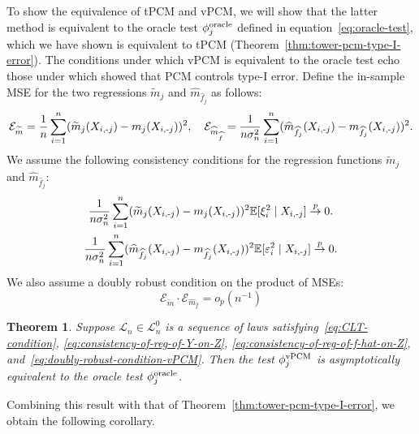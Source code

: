 \documentclass[12pt]{article}
\newtheorem{theorem}{Theorem}
\theoremstyle{definition}
\theoremstyle{remark}
\newcommand{\E}{\mathbb E}								%
\newcommand{\srx}{X}									%
\newcommand{\law}{\mathcal L}							%
\newcommand{\nulllaws}{\mathscr L^0}					%
\newcommand{\minus}{\textnormal{-}} 						    %
\begin{document}
To show the equivalence of tPCM and vPCM, we will show that the latter method is equivalent to the oracle test $\phi_j^{\textnormal{oracle}}$ defined in equation~\eqref{eq:oracle-test}, which we have shown is equivalent to tPCM (Theorem~\ref{thm:tower-pcm-type-I-error}). The conditions under which vPCM is equivalent to the oracle test echo those under which \citet{Lundborg2022a} showed that PCM controls type-I error. Define the in-sample MSE for the two regressions $\widetilde m_j$ and $\widehat{m}_{\widehat f_j}$ as follows:
\begin{gather*}
	\mathcal{E}_{\widetilde m} = \frac{1}{n} \sum_{i=1}^n (\widetilde m_j(\srx_{i,\minus j}) - m_j(\srx_{i,\minus j}))^2,\quad
	\mathcal{E}_{\widehat m_{\widehat f}} = \frac{1}{n\sigma_n^2} \sum_{i=1}^n (\widehat m_{\widehat f_j}(\srx_{i,\minus j}) - m_{\widehat f_j}(\srx_{i,\minus j}))^2.
\end{gather*}
We assume the following consistency conditions for the regression functions $\widetilde m_j$ and $\widehat m_{\widehat f_j}$:
\begin{gather}\label{eq:consistency-of-reg-of-Y-on-Z}
	\frac{1}{n\sigma_n^2}\sum_{i=1}^n (\widetilde m_j(\srx_{i,\minus j}) - m_j(\srx_{i,\minus j}))^2 \E[\xi_i^2\mid \srx_{i,\minus j}] \overset{p}{\to} 0.\\
	\label{eq:consistency-of-reg-of-f-hat-on-Z}
	\frac{1}{n\sigma_n^2} \sum_{i=1}^n (\widehat m_{\widehat f_j}(\srx_{i,\minus j}) - m_{\widehat f_j}(\srx_{i,\minus j}))^2\E[\varepsilon^2_i \mid \srx_{i,\minus j}] \overset{p}{\to} 0.
\end{gather} 	
We also assume a doubly robust condition on the product of MSEs:
\begin{equation}\label{eq:doubly-robust-condition-vPCM}
	\mathcal{E}_{\widetilde m} \cdot \mathcal{E}_{\widehat m_{\widehat f}}  = o_p(n^{-1})
\end{equation}

\begin{theorem}\label{thm:equivalence-of-vPCM-oracle}
	Suppose $\law_n \in \nulllaws_n$ is a sequence of laws satisfying~\eqref{eq:CLT-condition}, \eqref{eq:consistency-of-reg-of-Y-on-Z}, \eqref{eq:consistency-of-reg-of-f-hat-on-Z}, and~\eqref{eq:doubly-robust-condition-vPCM}. Then the test $\phi_j^{\textnormal{vPCM}}$ is asymptotically equivalent to the oracle test  $\phi_j^{\textnormal{oracle}}$.
\end{theorem}	

Combining this result with that of Theorem~\ref{thm:tower-pcm-type-I-error}, we obtain the following corollary.
\end{document}
